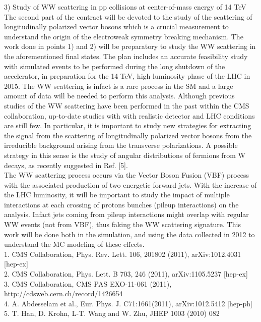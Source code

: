 \documentclass[10pt, a4paper]{article}
\begin{document}
 
3) Study of WW scattering in pp collisions at center-of-mass energy of 14 TeV \\
The second part of the contract will be devoted to the study 
of the scattering of longitudinally polarized vector bosons which is 
a crucial measurement to understand the origin of the electroweak symmetry breaking mechanism. 
The work done in points 1) and 2) will be preparatory to study the WW scattering 
in the aforementioned final states.
The plan includes an accurate feasibility study with simulated events to be performed 
during the long shutdown of the accelerator, in preparation for the 14 TeV, high 
luminosity phase of the LHC in 2015. The WW scattering is infact is a rare process 
in the SM and a large amount of data will be needed to perform this analysis. 
Although previous studies of the WW scattering have been performed in the 
past within the CMS collaboration, up-to-date studies with with realistic detector and 
LHC conditions are still few. In particular, it is important to study new strategies for extracting the signal from the scattering of longitudinally polarized vector bosons from the irreducible background arising from the transverse polarizations. A possible strategy in this sense is the study of angular distributions of fermions from W decays, as recently suggested in Ref. [5]. \\
The WW scattering process occurs via the Vector Boson Fusion (VBF) process
with the associated production of two energetic forward jets. With the increase of the 
LHC luminosity, it will be important to study the impact of multiple interactions 
at each crossing of protons bunches (pileup interactions) on the analysis.
Infact jets coming from pileup interactions might overlap with regular 
WW events (not from VBF), thus faking the WW scattering signature. This work will be done 
both in the simulation, and using the data collected in 2012 to understand the 
MC modeling of these effects. \\


1. CMS Collaboration, Phys. Rev. Lett. 106, 201802 (2011), arXiv:1012.4031 [hep-ex] \\ 
2. CMS Collaboration, Phys. Lett. B 703, 246 (2011), arXiv:1105.5237 [hep-ex] \\
3. CMS Collaboration, CMS PAS EXO-11-061 (2011), http://cdsweb.cern.ch/record/1426654  \\ 
4. A. Abdesselam et al., Eur. Phys. J. C71:1661(2011), arXiv:1012.5412 [hep-ph] \\
5. T. Han, D. Krohn, L-T. Wang and W. Zhu, JHEP 1003 (2010) 082 \\
  
\end{document}
